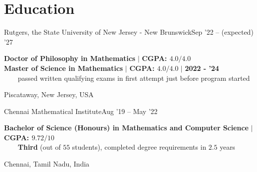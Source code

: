 \vspace{\gap}

\section{Education}
\resumeSubheading
{Rutgers, the State University of New Jersey - New Brunswick}{Sep '22 -- (expected) '27}
{\begin{minipage}{15cm} \color{grey}\textbf{Doctor of Philosophy in Mathematics}  $|$ \textbf{CGPA: $4.0/4.0$}\\
\textbf{Master of Science in Mathematics}  $|$ \textbf{CGPA: $4.0/4.0$} $|$ \textbf{\color{black}2022 - '24}\\
$\phantom{\qquad}$passed written qualifying exams in first attempt just before program started \end{minipage}
}{Piscataway, New Jersey, USA}

\resumeSubheading
{Chennai Mathematical Institute}{Aug '19 -- May '22}
{\begin{minipage}{15cm} \color{grey}\textbf{Bachelor of Science (Honours) in Mathematics and Computer Science} $|$ \textbf{CGPA: $9.72/10$} \\
$\phantom{\qquad}$\textbf{Third} (out of $55$ students), completed degree requirements in $2.5$ years\end{minipage}
}{Chennai, Tamil Nadu, India}
      

